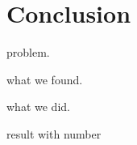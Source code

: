 \documentclass[conference]{IEEEtran}
\begin{document}


\section{Conclusion}
problem.

what we found.

what we did.

result with number






\vspace{12pt}
\end{document}
